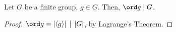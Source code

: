 \documentclass[12pt,oneside]{article}
\begin{document}
\begin{corollary}
  Let $G$ be a finite group, $g \in G$. Then, $\ord g \mid G$.
\end{corollary}
\begin{proof}
  $\ord g = |\langle g\rangle| \,\mid\,|G|$, by Lagrange's Theorem.
\end{proof}











































\end{document}
